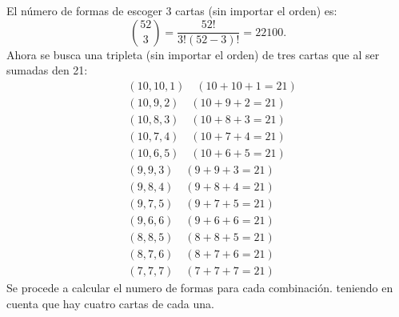 \documentclass[a4paper,12pt]{article}
\begin{document}
		El n\'umero de formas de escoger 3 cartas (sin importar el orden) es:
			\[
			\binom{52}{3} = \frac{52!}{3!(52- 3)!} = 22100.
			\]
		Ahora se busca una tripleta (sin importar el orden) de tres cartas que al ser sumadas den 21:
		\begin{align*}
			&(10, 10, 1) \quad (10+10+1 = 21)\\[1mm]
			&(10, 9, 2) \quad (10+9+2 = 21)\\[1mm]
			&(10, 8, 3) \quad (10+8+3 = 21)\\[1mm]
			&(10, 7, 4) \quad (10+7+4 = 21)\\[1mm]
			&(10, 6, 5) \quad (10+6+5 = 21)\\[1mm]
			&(9, 9, 3) \quad (9+9+3 = 21)\\[1mm]
			&(9, 8, 4) \quad (9+8+4 = 21)\\[1mm]
			&(9, 7, 5) \quad (9+7+5 = 21)\\[1mm]
			&(9, 6, 6) \quad (9+6+6 = 21)\\[1mm]
			&(8, 8, 5) \quad (8+8+5 = 21)\\[1mm]
			&(8, 7, 6) \quad (8+7+6 = 21)\\[1mm]
			&(7, 7, 7) \quad (7+7+7 = 21)
		\end{align*}
		Se procede a calcular el numero de formas para cada combinaci\'on. teniendo en cuenta que hay cuatro cartas de cada una.
\end{document}
